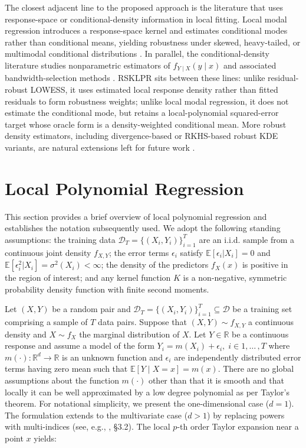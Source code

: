 \documentclass[preprint,1p,times,authoryear]{elsarticle}
\begin{document}
The closest adjacent line to the proposed approach is the literature that uses response-space or conditional-density information in local fitting. Local modal regression introduces a response-space kernel and estimates conditional modes rather than conditional means, yielding robustness under skewed, heavy-tailed, or multimodal conditional distributions \citep{YaoLindsayLi2012}. In parallel, the conditional-density literature studies nonparametric estimators of \(f_{Y\mid X}(y\mid x)\) and associated bandwidth-selection methods \citep{HyndmanBashtannykGrunwald1996,BashtannykHyndman2001,HallRacineLi2004,CattaneoChandakJanssonMa2024}. RSKLPR sits between these lines: unlike residual-robust LOWESS, it uses estimated local response density rather than fitted residuals to form robustness weights; unlike local modal regression, it does not estimate the conditional mode, but retains a local-polynomial squared-error target whose oracle form is a density-weighted conditional mean. More robust density estimators, including divergence-based or RKHS-based robust KDE variants, are natural extensions left for future work \citep{BasuHarrisHjortJones1998,KimScott2012}.

\section{Local Polynomial Regression}
\label{S:Local Polynomial Regression}
This section provides a brief overview of local polynomial regression and establishes the notation subsequently used. We adopt the following standing assumptions: the training data $\mathcal{D}_T = \{(X_i,Y_i)\}_{i=1}^{T}$ are an i.i.d. sample from a continuous joint density $f_{X,Y}$; the error terms $\epsilon_i$ satisfy $\mathbb{E}[\epsilon_i | X_i] = 0$ and $\mathbb{E}[\epsilon_i^2 | X_i] = \sigma^2(X_i) < \infty$; the density of the predictors $f_X(x)$ is positive in the region of interest; and any kernel function $K$ is a non-negative, symmetric probability density function with finite second moments.

Let $( X, Y )$ be a random pair and $\mathcal{D}_T = \{(X_i,Y_i)\}_{i=1}^{T} \subseteq \mathcal{D}$ be a training set comprising a sample of $T$ data pairs. Suppose that $(X , Y) \sim f_{X,Y}$ a continuous density and $X \sim f_X$ the marginal distribution of $X$. Let $Y \in \mathbb{R}$ be a continuous response and assume a model of the form $Y_i=m(X_i) + \epsilon_i, \; i \in 1, \dots \, ,T$ where $m(\cdot): \mathbb{R}^d \rightarrow \mathbb{R }$ is an unknown function and $\epsilon_i$ are independently distributed error terms having zero mean such that $\mathbb{E}[Y \mid X=x] = m(x)$. There are no global assumptions about the function $m(\cdot)$ other than that it is smooth and that locally it can be well approximated by a low degree polynomial as per Taylor’s theorem. For notational simplicity, we present the one-dimensional case ($d=1$). The formulation extends to the multivariate case ($d>1$) by replacing powers with multi-indices (see, e.g., \citep{Fan1996Local}, \S3.2). The local $p$-th order Taylor expansion near a point $x$ yields:
\end{document}
